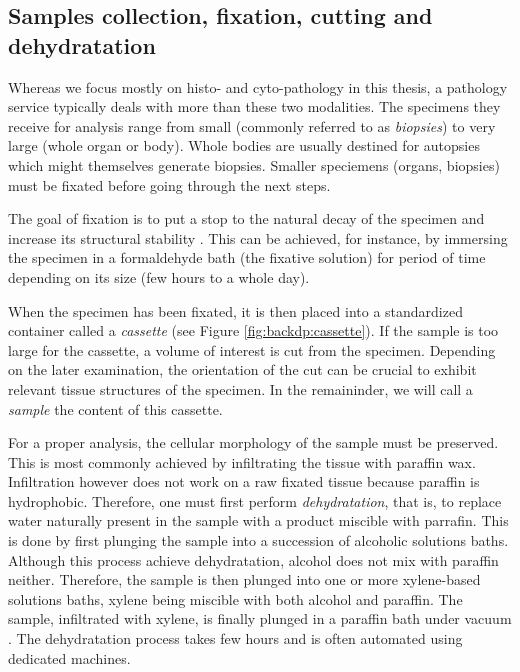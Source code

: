 \subsection{Samples collection, fixation, cutting and dehydratation}

Whereas we focus mostly on histo- and cyto-pathology in this thesis, a pathology service typically deals with more than these two modalities. The specimens they receive for analysis range from small (commonly referred to as \textit{biopsies}) to very large (whole organ or body). Whole bodies are usually destined for autopsies which might themselves generate biopsies. Smaller speciemens (organs, biopsies) must be fixated before going through the next steps. 

The goal of fixation is to put a stop to the natural decay of the specimen and increase its structural stability \parencite{rolls2012process}. This can be achieved, for instance, by immersing the specimen in a formaldehyde bath (\ie the fixative solution) for period of time depending on its size (\ie few hours to a whole day). 

When the specimen has been fixated, it is then placed into a standardized container called a \textit{cassette} (see Figure \ref{fig:backdp:cassette}). If the sample is too large for the cassette, a volume of interest is cut from the specimen. Depending on the later examination, the orientation of the cut can be crucial to exhibit relevant tissue structures of the specimen. In the remaininder, we will call a \textit{sample} the content of this cassette.

For a proper analysis, the cellular morphology of the sample must be preserved. This is most commonly achieved by infiltrating the tissue with paraffin wax. Infiltration however does not work on a raw fixated tissue because paraffin is hydrophobic. Therefore, one must first perform \textit{dehydratation}, that is, to replace water naturally present in the sample with a product miscible with parrafin. This is done by first plunging the sample into a succession of alcoholic solutions baths. Although this process achieve dehydratation, alcohol does not mix with paraffin neither. Therefore, the sample is then plunged into one or more xylene-based solutions baths, xylene being miscible with both alcohol and paraffin. The sample, infiltrated with xylene, is finally plunged in a paraffin bath under vacuum . The dehydratation process takes few hours and is often automated using dedicated machines.  

